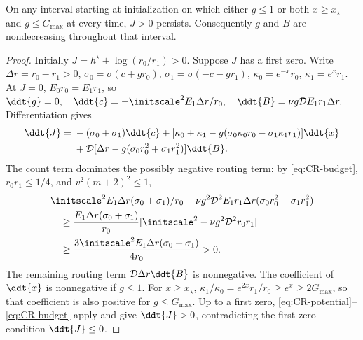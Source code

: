 \begin{lemma}
\label{lem:CR-monotone}
On any interval starting at initialization on which either $g\le1$ or both $x\ge x_\star$ and $g\le G_{\max}$ at every time,
$J>0$ persists. Consequently $g$ and $B$ are nondecreasing throughout that interval.
\end{lemma}
\begin{proof}
Initially $J=h^\star+\log(r_0/r_1)>0$. Suppose $J$ has a first zero.
Write $\Delta r=r_0-r_1>0$, $\sigma_0=\sigma(c+gr_0)$, $\sigma_1=\sigma(-c-gr_1)$,
$\kappa_0=e^{-x}r_0$, $\kappa_1=e^xr_1$.
At $J=0$, $E_0r_0=E_1r_1$, so
 $\ddt{g}=0,\quad \ddt{c}=-\initscale^2 E_1\Delta r/r_0,\quad \ddt{B}=\nu g\mathcal DE_1r_1\Delta r.$ 
Differentiation gives
\begin{align*}
 \ddt{J}={}&-(\sigma_0+\sigma_1)\ddt{c}
 +[\kappa_0+\kappa_1-g(\sigma_0\kappa_0r_0-\sigma_1\kappa_1r_1)]\ddt{x}\\
 &+\mathcal D[\Delta r-g(\sigma_0r_0^2+\sigma_1r_1^2)]\ddt{B}.
\end{align*}
The count term dominates the possibly negative routing term: by \eqref{eq:CR-budget}, $r_0r_1\le1/4$, and $v^2(m+2)^2\le1$,
\begin{align*}
 &\initscale^2 E_1\Delta r(\sigma_0+\sigma_1)/r_0
 -\nu g^2\mathcal D^2E_1r_1\Delta r(\sigma_0r_0^2+\sigma_1r_1^2)\\
 &\hspace{1em}\ge\frac{E_1\Delta r(\sigma_0+\sigma_1)}{r_0}
       [\initscale^2-\nu g^2\mathcal D^2r_0r_1]\\
 &\hspace{1em}\ge\frac{3\initscale^2 E_1\Delta r(\sigma_0+\sigma_1)}{4r_0}>0.
\end{align*}
The remaining routing term $\mathcal D\Delta r\ddt{B}$ is nonnegative.
The coefficient of $\ddt{x}$ is nonnegative if $g\le1$.
For $x\ge x_\star$, $\kappa_1/\kappa_0=e^{2x}r_1/r_0\ge e^x\ge2G_{\max}$, so that coefficient is also positive for $g\le G_{\max}$.
Up to a first zero, \eqref{eq:CR-potential}--\eqref{eq:CR-budget} apply and give $\ddt{J}>0$, contradicting the first-zero condition $\ddt{J}\le0$.
\end{proof}

